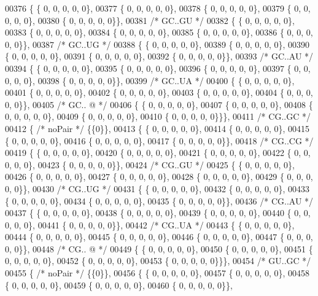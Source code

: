 \begin{DoxyCode}
00376 \{ \{  0, 0, 0, 0, 0\},
00377 \{  0, 0, 0, 0, 0\},
00378 \{  0, 0, 0, 0, 0\},
00379 \{  0, 0, 0, 0, 0\},
00380 \{  0, 0, 0, 0, 0\}\},
00381  \textcolor{comment}{/* GC..GU */}
00382 \{ \{  0, 0, 0, 0, 0\},
00383 \{  0, 0, 0, 0, 0\},
00384 \{  0, 0, 0, 0, 0\},
00385 \{  0, 0, 0, 0, 0\},
00386 \{  0, 0, 0, 0, 0\}\},
00387  \textcolor{comment}{/* GC..UG */}
00388 \{ \{  0, 0, 0, 0, 0\},
00389 \{  0, 0, 0, 0, 0\},
00390 \{  0, 0, 0, 0, 0\},
00391 \{  0, 0, 0, 0, 0\},
00392 \{  0, 0, 0, 0, 0\}\},
00393  \textcolor{comment}{/* GC..AU */}
00394 \{ \{  0, 0, 0, 0, 0\},
00395 \{  0, 0, 0, 0, 0\},
00396 \{  0, 0, 0, 0, 0\},
00397 \{  0, 0, 0, 0, 0\},
00398 \{  0, 0, 0, 0, 0\}\},
00399  \textcolor{comment}{/* GC..UA */}
00400 \{ \{  0, 0, 0, 0, 0\},
00401 \{  0, 0, 0, 0, 0\},
00402 \{  0, 0, 0, 0, 0\},
00403 \{  0, 0, 0, 0, 0\},
00404 \{  0, 0, 0, 0, 0\}\},
00405  \textcolor{comment}{/* GC.. @ */}
00406 \{ \{  0, 0, 0, 0, 0\},
00407 \{  0, 0, 0, 0, 0\},
00408 \{  0, 0, 0, 0, 0\},
00409 \{  0, 0, 0, 0, 0\},
00410 \{  0, 0, 0, 0, 0\}\}\},
00411  \textcolor{comment}{/* CG..GC */}
00412 \{ \textcolor{comment}{/* noPair */} \{\{0\}\},
00413 \{ \{  0, 0, 0, 0, 0\},
00414 \{  0, 0, 0, 0, 0\},
00415 \{  0, 0, 0, 0, 0\},
00416 \{  0, 0, 0, 0, 0\},
00417 \{  0, 0, 0, 0, 0\}\},
00418  \textcolor{comment}{/* CG..CG */}
00419 \{ \{  0, 0, 0, 0, 0\},
00420 \{  0, 0, 0, 0, 0\},
00421 \{  0, 0, 0, 0, 0\},
00422 \{  0, 0, 0, 0, 0\},
00423 \{  0, 0, 0, 0, 0\}\},
00424  \textcolor{comment}{/* CG..GU */}
00425 \{ \{  0, 0, 0, 0, 0\},
00426 \{  0, 0, 0, 0, 0\},
00427 \{  0, 0, 0, 0, 0\},
00428 \{  0, 0, 0, 0, 0\},
00429 \{  0, 0, 0, 0, 0\}\},
00430  \textcolor{comment}{/* CG..UG */}
00431 \{ \{  0, 0, 0, 0, 0\},
00432 \{  0, 0, 0, 0, 0\},
00433 \{  0, 0, 0, 0, 0\},
00434 \{  0, 0, 0, 0, 0\},
00435 \{  0, 0, 0, 0, 0\}\},
00436  \textcolor{comment}{/* CG..AU */}
00437 \{ \{  0, 0, 0, 0, 0\},
00438 \{  0, 0, 0, 0, 0\},
00439 \{  0, 0, 0, 0, 0\},
00440 \{  0, 0, 0, 0, 0\},
00441 \{  0, 0, 0, 0, 0\}\},
00442  \textcolor{comment}{/* CG..UA */}
00443 \{ \{  0, 0, 0, 0, 0\},
00444 \{  0, 0, 0, 0, 0\},
00445 \{  0, 0, 0, 0, 0\},
00446 \{  0, 0, 0, 0, 0\},
00447 \{  0, 0, 0, 0, 0\}\},
00448  \textcolor{comment}{/* CG.. @ */}
00449 \{ \{  0, 0, 0, 0, 0\},
00450 \{  0, 0, 0, 0, 0\},
00451 \{  0, 0, 0, 0, 0\},
00452 \{  0, 0, 0, 0, 0\},
00453 \{  0, 0, 0, 0, 0\}\}\},
00454  \textcolor{comment}{/* GU..GC */}
00455 \{ \textcolor{comment}{/* noPair */} \{\{0\}\},
00456 \{ \{  0, 0, 0, 0, 0\},
00457 \{  0, 0, 0, 0, 0\},
00458 \{  0, 0, 0, 0, 0\},
00459 \{  0, 0, 0, 0, 0\},
00460 \{  0, 0, 0, 0, 0\}\},

\end{DoxyCode}
